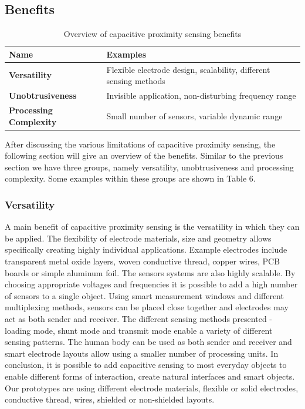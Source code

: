 \subsection{Benefits}
\begin{table}[htbp]
  \centering
  \caption{Overview of capacitive proximity sensing benefits}
    \begin{tabular}{p{4cm}p{6cm}}
    \toprule
    \textbf{Name} & \textbf{Examples} \\
    \midrule
    \textbf{Versatility} & Flexible electrode design, scalability, different sensing methods \\
    \textbf{Unobtrusiveness} & Invisible application, non-disturbing frequency range \\
    \textbf{Processing Complexity} & Small number of sensors, variable dynamic range \\
    \bottomrule
    \end{tabular}%
  \label{tab:cap_benefits}%
\end{table}%

After discussing the various limitations of capacitive proximity sensing, the following section will give an overview of the benefits.  Similar to the previous section we have three groups, namely versatility, unobtrusiveness and processing complexity. Some examples within these groups are shown in Table 6.
\subsubsection{Versatility}
A main benefit of capacitive proximity sensing is the versatility in which they can be applied. The flexibility of electrode materials, size and geometry allows specifically creating highly individual applications. Example electrodes include transparent metal oxide layers, woven conductive thread, copper wires, PCB boards or simple aluminum foil. 
The sensors systems are also highly scalable. By choosing appropriate voltages and frequencies it is possible to add a high number of sensors to a single object. Using smart measurement windows and different multiplexing methods, sensors can be placed close together and electrodes may act as both sender and receiver.
The different sensing methods presented - loading mode, shunt mode and transmit mode enable a variety of different sensing patterns. The human body can be used as both sender and receiver and smart electrode layouts allow using a smaller number of processing units. 
In conclusion, it is possible to add capacitive sensing to most everyday objects to enable different forms of interaction, create natural interfaces and smart objects. Our prototypes are using different electrode materials, flexible or solid electrodes, conductive thread, wires, shielded or non-shielded layouts. 
